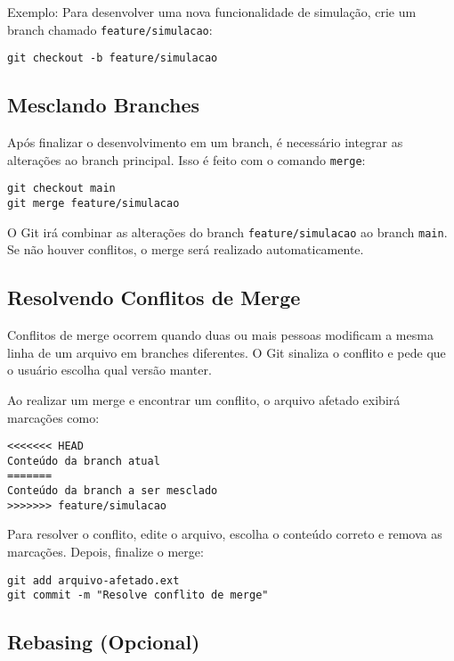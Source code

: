 Exemplo: Para desenvolver uma nova funcionalidade de simulação, crie um branch chamado \texttt{feature/simulacao}:

\begin{lstlisting}[style=shellstyle]
git checkout -b feature/simulacao
\end{lstlisting}

\subsection{Mesclando Branches}

Após finalizar o desenvolvimento em um branch, é necessário integrar as alterações ao branch principal. Isso é feito com o comando \texttt{merge}:

\begin{lstlisting}[style=shellstyle]
git checkout main
git merge feature/simulacao
\end{lstlisting}

O Git irá combinar as alterações do branch \texttt{feature/simulacao} ao branch \texttt{main}. Se não houver conflitos, o merge será realizado automaticamente.

\subsection{Resolvendo Conflitos de Merge}

Conflitos de merge ocorrem quando duas ou mais pessoas modificam a mesma linha de um arquivo em branches diferentes. O Git sinaliza o conflito e pede que o usuário escolha qual versão manter.

Ao realizar um merge e encontrar um conflito, o arquivo afetado exibirá marcações como:

\begin{verbatim}
<<<<<<< HEAD
Conteúdo da branch atual
=======
Conteúdo da branch a ser mesclado
>>>>>>> feature/simulacao
\end{verbatim}

Para resolver o conflito, edite o arquivo, escolha o conteúdo correto e remova as marcações. Depois, finalize o merge:

\begin{lstlisting}[style=shellstyle]
git add arquivo-afetado.ext
git commit -m "Resolve conflito de merge"
\end{lstlisting}

\subsection{Rebasing (Opcional)}

